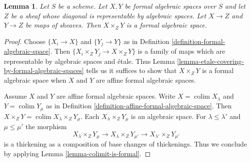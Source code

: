 \documentclass{stacks-project}
\theoremstyle{plain}
\newtheorem{lemma}[subsection]{Lemma}
\theoremstyle{definition}
\theoremstyle{remark}
\numberwithin{equation}{subsection}
\def\colim{\mathop{\mathrm{colim}}\nolimits}
\begin{document}
\begin{lemma}
\label{lemma-fibre-products-general}
Let $S$ be a scheme. Let $X, Y$ be formal algebraic spaces over $S$
and let $Z$ be a sheaf whose diagonal is representable by
algebraic spaces. Let $X \to Z$ and $Y \to Z$ be maps of sheaves.
Then $X \times_Z Y$ is a formal algebraic space.
\end{lemma}

\begin{proof}
Choose $\{X_i \to X\}$ and $\{Y_j \to Y\}$ as in
Definition \ref{definition-formal-algebraic-space}.
Then $\{X_i \times_Z Y_j \to X \times_Z Y\}$ is a family
of maps which are representable by algebraic spaces and \'etale.
Thus Lemma \ref{lemma-etale-covering-by-formal-algebraic-spaces}
tells us it suffices to show that $X \times_Z Y$ is a formal
algebraic space when $X$ and $Y$ are affine formal algebraic spaces.

\medskip\noindent
Assume $X$ and $Y$ are affine formal algebraic spaces.
Write $X = \colim X_\lambda$ and $Y = \colim Y_\mu$ as
in Definition \ref{definition-affine-formal-algebraic-space}.
Then $X \times_Z Y = \colim X_\lambda \times_Z Y_\mu$.
Each $X_\lambda \times_Z Y_\mu$ is an algebraic space.
For $\lambda \leq \lambda'$ and $\mu \leq \mu'$ the morphism
$$
X_\lambda \times_Z Y_\mu \to
X_\lambda \times_Z Y_{\mu'} \to
X_{\lambda'} \times_Z Y_{\mu'}
$$
is a thickening as a composition of base changes of thickenings.
Thus we conclude by applying Lemma \ref{lemma-colimit-is-formal}.
\end{proof}
\end{document}

